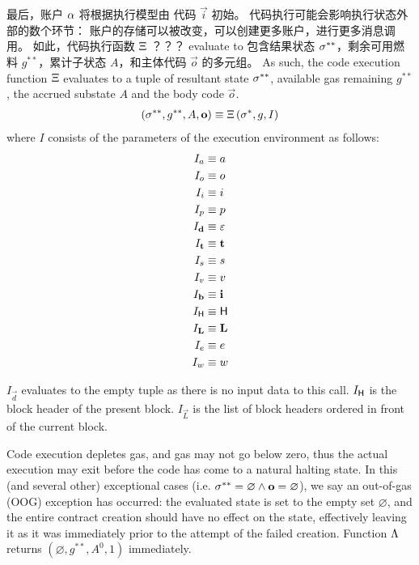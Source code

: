 最后，账户 $\mathbf{\alpha}$ 将根据执行模型由 \cvm 代码 $\vec{i}$ 初始。
代码执行可能会影响执行状态外部的数个环节：
账户的存储可以被改变，可以创建更多账户，进行更多消息调用。
如此，代码执行函数 $\mathrm{\Xi}$ 
？？？ evaluate to
包含结果状态 $\mathbf{\sigma}^{**}$，剩余可用燃料 $g^{**}$，累计子状态 $A$，和主体代码 $\vec{o}$ 的多元组。
As such, the code execution function $\mathrm{\Xi}$ evaluates to a tuple of resultant state $\mathbf{\sigma}^{**}$, available gas remaining $g^{**}$, the accrued substate $A$ and the body code $\vec{o}$.
\begin{align}
	\left(\mathbf{\sigma}^{**}, g^{**},  A, \mathbf{o} \right) \equiv \mathrm{\Xi}\left(\mathbf{\sigma}^*, g, I\right)
\end{align}
where $I$ consists of the parameters of the execution environment as follows:
\begin{align}
	I_a &\equiv a\\
	I_o &\equiv o\\
	I_i &\equiv i\\
	I_p &\equiv p\\
	I_{\mathbf{d}} &\equiv \mathbb{\varepsilon}\\
	I_{\mathbf{t}} & \equiv \mathbf{t}\\
	I_s &\equiv s\\
	I_v &\equiv v\\
	I_{\mathbf{b}} &\equiv \mathbf{i}\\
	I_{\textsf{H}} & \equiv \textsf{H} \\
	I_{\mathbf{L}} & \equiv \mathbf{L} \\ 
	I_e &\equiv e\\
	I_w &\equiv w
\end{align}

$I_{\vec{d}}$ evaluates to the empty tuple as there is no input data to this call. 
$I_{\textsf{H}}$ is the block header of the present block.
$I_\vec{L}$ is the list of block headers ordered in front of the current block.

Code execution depletes gas, and gas may not go below zero, thus the actual execution may exit before the code has come to a natural halting state.
In this (and several other) exceptional cases (i.e. $\mathbf{\sigma}^{**}=\varnothing \land \mathbf{o}=\varnothing$), we say an out-of-gas (OOG) exception has occurred:
the evaluated state is set to the empty set $\varnothing$, 
and the entire contract creation should have no effect on the state, effectively leaving it as it was immediately prior to the attempt of the failed creation.
%
Function $\mathrm{\Lambda}$ returns $(\varnothing,g^{**},A^0,1)$ immediately. 


